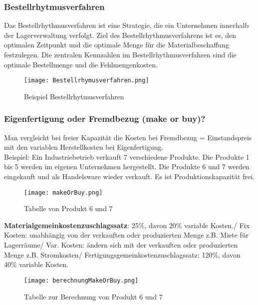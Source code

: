 \documentclass[asp1.tex]{subfiles}
\begin{document}
\subsubsection{Bestellrhytmusverfahren}
Das Bestellrhythmusverfahren ist eine Strategie, die ein Unternehmen innerhalb der Lagerverwaltung verfolgt. Ziel des Bestellrhythmusverfahrens ist es, den optimalen Zeitpunkt und die optimale Menge für die Materialbeschaffung festzulegen. Die zentralen Kennzahlen im Bestellrhythmusverfahren sind die optimale Bestellmenge und die Fehlmengenkosten.

\begin{figure}[H]
    \begin{center}
        \texttt{[image: Bestellrhymusverfahren.png]}
    \end{center}
    \caption{Beispiel Bestellrhytmusverfahren}
    \label{fig:my_label}
\end{figure}

\subsubsection{Eigenfertigung oder Fremdbezug (make or buy)?}
Man vergleicht bei freier Kapazität die Kosten bei Fremdbezug = Einstandspreis mit den variablen Herstellkosten bei Eigenfertigung. \\
Beispiel: Ein Industriebetrieb verkauft 7 verschiedene Produkte. Die Produkte 1 bis 5 werden im eigenen Unternehmen hergestellt.
Die Produkte 6 und 7 werden eingekauft und als Handelsware wieder verkauft.
Es ist Produktionskapazität frei.

\begin{figure}[H]
    \begin{center}
        \texttt{[image: makeOrBuy.png]}
    \end{center}
    \caption{Tabelle von Produkt 6 und 7}
    \label{fig:MakeOrBuy.png}
\end{figure}

\textbf{Materialgemeinkostenzuschlagssatz}: 25\%, davon 20\% variable Kosten./
Fix Kosten: unabhängig von der verkauften oder produzierten Menge z.B. Miete für Lagerräume/
Var. Kosten: ändern sich mit der verkauften oder produzierten Menge z.B. Stromkosten/
Fertigungsgemeinkostenzuschlagssatz: 120\%, davon 40\% variable Kosten.

\begin{figure}[H]
    \begin{center}
        \texttt{[image: berechnungMakeOrBuy.png]}
    \end{center}
    \caption{Tabelle zur Berechnung von Produkt 6 und 7}
    \label{fig:berechnungMakeOrBuy.png}
\end{figure}
\end{document}
